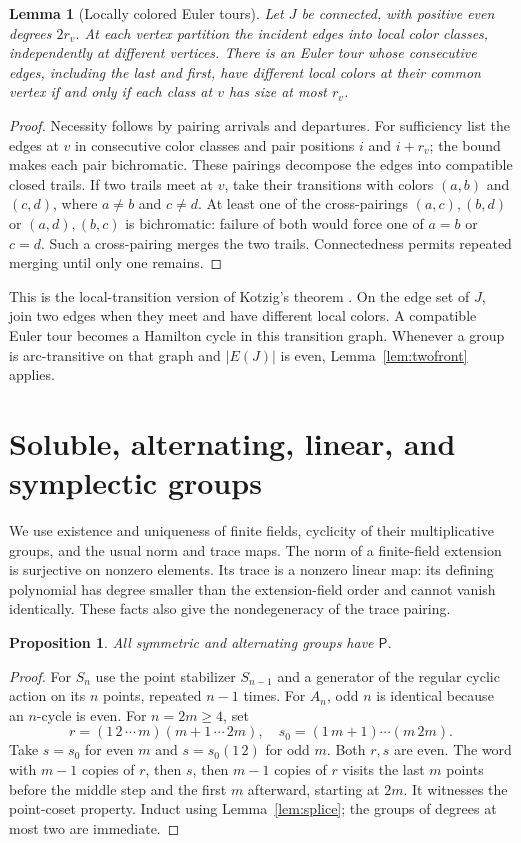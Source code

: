 \documentclass[11pt]{article}
\newtheorem{lemma}[theorem]{Lemma}
\newtheorem{proposition}[theorem]{Proposition}
\theoremstyle{definition}
\newcommand{\Pp}{\mathsf P}
\begin{document}
\begin{lemma}[Locally colored Euler tours]\label{lem:kotzig}
Let $J$ be connected, with positive even degrees $2r_v$. At each vertex partition the incident edges into local color classes, independently at different vertices. There is an Euler tour whose consecutive edges, including the last and first, have different local colors at their common vertex if and only if each class at $v$ has size at most $r_v$.
\end{lemma}
\begin{proof}
Necessity follows by pairing arrivals and departures. For sufficiency list the edges at $v$ in consecutive color classes and pair positions $i$ and $i+r_v$; the bound makes each pair bichromatic. These pairings decompose the edges into compatible closed trails. If two trails meet at $v$, take their transitions with colors $(a,b)$ and $(c,d)$, where $a\ne b$ and $c\ne d$. At least one of the cross-pairings $(a,c),(b,d)$ or $(a,d),(b,c)$ is bichromatic: failure of both would force one of $a=b$ or $c=d$. Such a cross-pairing merges the two trails. Connectedness permits repeated merging until only one remains.
\end{proof}
This is the local-transition version of Kotzig's theorem \cite{Kotzig}. On the edge set of $J$, join two edges when they meet and have different local colors. A compatible Euler tour becomes a Hamilton cycle in this transition graph. Whenever a group is arc-transitive on that graph and $|E(J)|$ is even, Lemma~\ref{lem:twofront} applies.

\section{Soluble, alternating, linear, and symplectic groups}\label{sec:linear}
We use existence and uniqueness of finite fields, cyclicity of their multiplicative groups, and the usual norm and trace maps. The norm of a finite-field extension is surjective on nonzero elements. Its trace is a nonzero linear map: its defining polynomial has degree smaller than the extension-field order and cannot vanish identically. These facts also give the nondegeneracy of the trace pairing.

\begin{proposition}\label{prop:alternating}
All symmetric and alternating groups have $\Pp$.
\end{proposition}
\begin{proof}
For $S_n$ use the point stabilizer $S_{n-1}$ and a generator of the regular cyclic action on its $n$ points, repeated $n-1$ times. For $A_n$, odd $n$ is identical because an $n$-cycle is even. For $n=2m\ge4$, set
\[
r=(1\,2\,\cdots\,m)(m+1\,\cdots\,2m),\quad
s_0=(1\,m+1)\cdots(m\,2m).
\]
Take $s=s_0$ for even $m$ and $s=s_0(1\,2)$ for odd $m$. Both $r,s$ are even. The word with $m-1$ copies of $r$, then $s$, then $m-1$ copies of $r$ visits the last $m$ points before the middle step and the first $m$ afterward, starting at $2m$. It witnesses the point-coset property. Induct using Lemma~\ref{lem:splice}; the groups of degrees at most two are immediate.
\end{proof}
\end{document}
